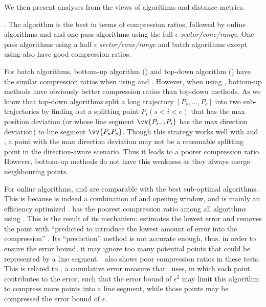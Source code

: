 




We then present analyses from the views of \lsa algorithms and distance metrics.


. The \opt algorithm is the best in terms of compression ratios, followed by online algorithms \opwa and \bqsa and one-pass algorithms using the full $\epsilon$ \emph{sector/cone/range}. One-pass algorithms using a half $\epsilon$ \emph{sector/cone/range} and batch algorithms except \dpa using \dad also have good compression ratios.



For batch algorithms, bottom-up algorithm (\tpa) and top-down algorithm (\dpa) have the similar compression ratios when using \ped and \sed. However, when using \dad, bottom-up methods have obviously better compression ratios than top-down methods.  As we know that top-down algorithms split a long trajectory $[P_s, ..., P_e]$ into two sub-trajectories by finding out a splitting point $P_i (s<i<e)$ that has the max position deviation (or whose line segment $\vv{P_{i-1}P_{i}}$ has the max direction deviation) to line segment $\vv{P_sP_{e}}$. Though this strategy works well with \ped and \sed, a point with the max direction deviation may not be a reasonable splitting point in the direction-aware scenario. Thus it leads to a poorer compression ratio. However, bottom-up methods do not have this weakness as they always merge neighbouring points.



For online algorithms, \bqsa and \opwa are comparable with the best sub-optimal algorithms. This is because \opwa is indeed a combination of \dpa and opening window, and \bqsa is mainly an efficiency optimized \opwa.
\squishe has the poorest compression ratio among all algorithms using \sed. This is the result of its mechanism: \squishe estimates the lowest \sed error and removes the point with ``predicted to introduce the lowest amount of error into the compression'' \cite{Muckell:SQUISH}. Its ``prediction'' method is not accurate enough, thus, in order to ensure the error bound, it may ignore too many potential points that could be represented by a line segment. {\dagots~also shows poor compression ratios in these tests. This is related to \lissed, a cumulative error measure that \dagots~uses, in which each point contributes to the error, such that the \lissed error bound of $\epsilon^2$ may limit this algorithm to compress more points into a line segment, while those points may be compressed \wrt the  \sed error bound of $\epsilon$.}

